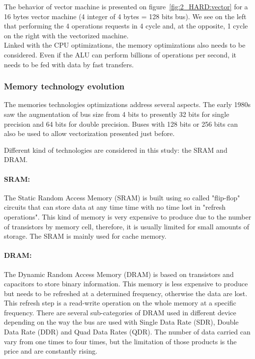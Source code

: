 The behavior of vector machine is presented on figure~\ref{fig:2_HARD:vector} for a 16 bytes vector machine (4 integer of 4 bytes = 128 bits bus). 
We see on the left that performing the 4 operations requests in 4 cycle and, at the opposite, 1 cycle on the right with the vectorized machine.\\

Linked with the CPU optimizations, the memory optimizations also needs to be considered. 
Even if the ALU can perform billions of operations per second, it needs to be fed with data by fast transfers.

\subsubsection{Memory technology evolution}

The memories technologies optimizations address several aspects. 
The early 1980s saw the augmentation of bus size from 4 bits to presently 32 bits for single precision and 64 bits for double precision. 
Buses with 128 bits or 256 bits can also be used to allow vectorization presented just before. 

Different kind of technologies are considered in this study: the SRAM and DRAM. 

\paragraph{SRAM: }
The Static Random Access Memory (SRAM) is built using so called "flip-flop" circuits that can store data at any time time with no time lost in "refresh operations".
This kind of memory is very expensive to produce due to the number of transistors by memory cell, therefore, it is usually limited for small amounts of storage. 
The SRAM is mainly used for cache memory. 

\paragraph{DRAM: }
The Dynamic Random Access Memory (DRAM) is based on transistors and capacitors to store binary information.
This memory is less expensive to produce but needs to be refreshed at a determined frequency, otherwise the data are lost. 
This refresh step is a read-write operation on the whole memory at a specific frequency. 
There are several sub-categories of DRAM used in different device depending on the way the bus are used with Single Data Rate (SDR), Double Data Rate (DDR) and Quad Data Rates (QDR). 
The number of data carried can vary from one times to four times, but the limitation of those products is the price and are constantly rising. 

